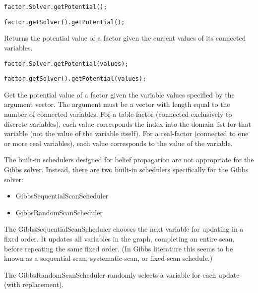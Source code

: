 
\ifmatlab
\begin{lstlisting}
factor.Solver.getPotential();
\end{lstlisting}
\fi

\ifjava
\begin{lstlisting}
factor.getSolver().getPotential();
\end{lstlisting}
\fi

Returns the potential value of a factor given the current values of its connected variables.

\ifmatlab
\begin{lstlisting}
factor.Solver.getPotential(values);
\end{lstlisting}
\fi

\ifjava
\begin{lstlisting}
factor.getSolver().getPotential(values);
\end{lstlisting}
\fi

Get the potential value of a factor given the variable values specified by the argument vector. The argument must be a vector with length equal to the number of connected variables. For a table-factor (connected exclusively to discrete variables), each value corresponds the index into the domain list for that variable (not the value of the variable itself). For a real-factor (connected to one or more real variables), each value corresponds to the value of the variable.


The built-in schedulers designed for belief propagation are not appropriate for the Gibbs solver.  Instead, there are two built-in schedulers specifically for the Gibbs solver:

\begin{itemize}
\item GibbsSequentialScanScheduler
\item GibbsRandomScanScheduler
\end{itemize}

The GibbsSequentialScanScheduler chooses the next variable for updating in a fixed order. It updates all variables in the graph, completing an entire scan, before repeating the same fixed order. (In Gibbs literature this seems to be known as a sequential-scan, systematic-scan, or fixed-scan schedule.)

The GibbsRandomScanScheduler randomly selects a variable for each update (with replacement).

